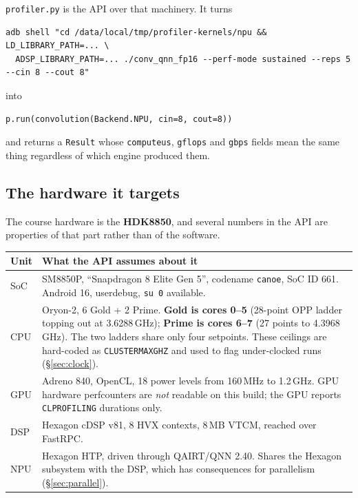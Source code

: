 \documentclass[11pt,a4paper]{article}
\newcommand{\code}[1]{\texttt{\let\_\breakableunderscore #1}}
\newcommand{\breakableunderscore}{\textunderscore\allowbreak}
\begin{document}
\code{profiler.py} is the API over that machinery. It turns

\begin{lstlisting}[style=sh]
adb shell "cd /data/local/tmp/profiler-kernels/npu && LD_LIBRARY_PATH=... \
  ADSP_LIBRARY_PATH=... ./conv_qnn_fp16 --perf-mode sustained --reps 5 --cin 8 --cout 8"
\end{lstlisting}

\noindent into

\begin{lstlisting}
p.run(convolution(Backend.NPU, cin=8, cout=8))
\end{lstlisting}

\noindent and returns a \code{Result} whose \code{compute\_us}, \code{gflops}
and \code{gbps} fields mean the same thing regardless of which engine produced
them.

\subsection{The hardware it targets}
\label{sec:hardware}

The course hardware is the \textbf{HDK8850}, and several numbers in the API
are properties of that part rather than of the software.

\begin{longtable}{@{}p{2.6cm}p{12.2cm}@{}}
\toprule
\textbf{Unit} & \textbf{What the API assumes about it} \\
\midrule
\endhead
SoC & SM8850P, ``Snapdragon 8 Elite Gen 5'', codename \code{canoe}, SoC ID 661.
  Android 16, userdebug, \code{su 0} available. \\
CPU & Oryon-2, 6 Gold + 2 Prime. \textbf{Gold is cores 0--5} (28-point OPP
  ladder topping out at 3.6288\,GHz); \textbf{Prime is cores 6--7} (27 points to
  4.3968\,GHz). The two ladders share only four setpoints. These ceilings are
  hard-coded as \code{CLUSTER\_MAX\_GHZ} and used to flag under-clocked runs
  (\S\ref{sec:clock}). \\
GPU & Adreno 840, OpenCL, 18 power levels from 160\,MHz to 1.2\,GHz. GPU
  hardware perfcounters are \emph{not} readable on this build; the GPU reports
  \code{CL\_PROFILING} durations only. \\
DSP & Hexagon cDSP v81, 8 HVX contexts, 8\,MB VTCM, reached over FastRPC. \\
NPU & Hexagon HTP, driven through QAIRT/QNN 2.40. Shares the Hexagon subsystem
  with the DSP, which has consequences for parallelism (\S\ref{sec:parallel}). \\
\bottomrule
\end{longtable}
\end{document}
